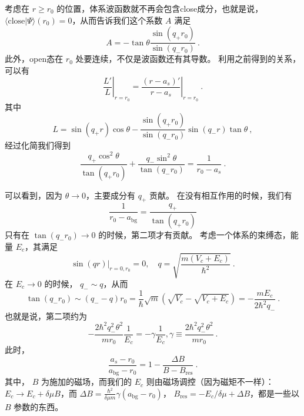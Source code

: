 考虑在 $r\geqslant r_0$ 的位置，体系波函数就不再会包含close成分，也就是说， $\langle\text{close}|\Psi\rangle(r_0) = 0$，从而告诉我们这个系数 $A$ 满足
\begin{equation}
A=-\tan\theta\frac{\sin(q_+r_0)}{\sin(q_-r_0)}~.
\end{equation}
此外，open态在 $r_0$ 处要连续，不仅是波函数还有其导数。 利用之前得到的关系，可以有
\begin{equation}
\left.\frac{L'}{L}\right|_{r=r_0} = \left.\frac{(r-a_s)'}{r-a_s}\right|_{r=r_0}~.
\end{equation}
其中
\begin{equation}
L = \sin(q_+r)\cos\theta - \frac{\sin(q_+r_0)}{\sin(q_-r_0)} \sin(q_-r)\tan\theta~,
\end{equation}
经过化简我们得到
\begin{equation}
\frac{q_+\cos^2\theta}{\tan(q_+r_0)}+\frac{q_-\sin^2\theta}{\tan(q_-r_0)} = \frac{1}{r_0-a_s}~.
\end{equation}

可以看到，因为 $\theta\to0$，主要成分有 $q_+$ 贡献。 在没有相互作用的时候，我们有
\begin{equation}
\frac{1}{r_0-a_{\text{bg}}} = \frac{q_+}{\tan(q_+r_0)}
\end{equation}
只有在 $\tan(q_-r_0)\to0$ 的时候，第二项才有贡献。
考虑一个体系的束缚态，能量 $E_c$，其满足
\begin{equation}
\left.\sin(qr)\right|_{r=0,r_0} = 0,\quad q = \sqrt{\frac{m(V_c+E_c)}{\hbar^2}}~.
\end{equation}
在 $E_c\to0$ 的时候， $q_-\sim q$，从而
\begin{equation}
\tan(q_-r_0)\sim (q_- -q) r_0 = \frac{1}{\hbar}\sqrt{m}(\sqrt{V_c}-\sqrt{V_c+E_c}) =-\frac{mE_c}{2\hbar^2 q_-}~.
\end{equation}
也就是说，第二项约为
\begin{equation}
-\frac{2\hbar^2q_-^2\theta^2}{mr_0}\frac{1}{E_c} = -\gamma\frac{1}{E_c}, \gamma\equiv\frac{2\hbar^2q_-^2\theta^2}{mr_0} ~.
\end{equation}
此时，
\begin{equation}
\frac{a_s-r_0}{a_{\text{bg}}-r_0} = 1-\frac{\Delta B}{B-B_{\text{res}}}~.
\end{equation}
其中， $B$ 为施加的磁场，而我们的 $E_c$ 则由磁场调控（因为磁矩不一样）： $E_c\to E_c+\delta\mu B$，而 $\Delta B = \frac{\hbar^2}{\delta\mu m}\gamma(a_{\text{bg}}-r_0)$， $B_{\text{res}} = -{E_c}/{\delta\mu}+\Delta B$，都是一些以 $B$ 参数的东西。